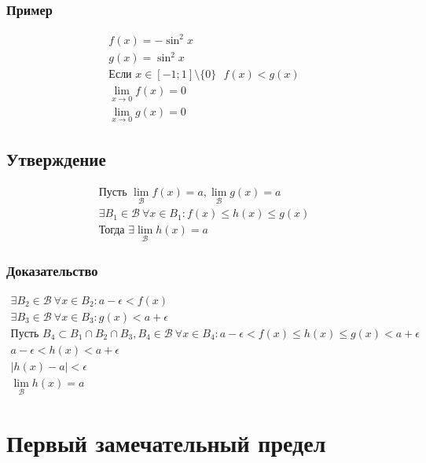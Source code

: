 \documentclass{article}
\begin{document}
\subsubsection{Пример}
\begin{gather*}
    f(x) = -\sin^2 x \\
    g(x) =  \sin^2 x \\
    \text{Если } x \in [-1; 1] \setminus \{0\} ~~~ f(x) < g(x) \\
    \lim_{x \to 0} f(x) = 0 \\
    \lim_{x \to 0} g(x) = 0
\end{gather*}


\subsection{Утверждение}
\begin{gather*}
    \text{Пусть } \lim_{\mathcal{B}} f(x) = a, \lim_{\mathcal{B}} g(x) = a \\
    \exists B_1 \in \mathcal{B} ~ \forall x \in B_1: f(x) \le h(x) \le g(x) \\
    \text{Тогда } \exists \lim_{\mathcal{B}} h(x) = a
\end{gather*}

\subsubsection{Доказательство}
\begin{gather*}
    \exists B_2 \in \mathcal{B} ~ \forall x \in B_2: a - \epsilon < f(x) \\
    \exists B_3 \in \mathcal{B} ~ \forall x \in B_3: g(x) < a + \epsilon \\
    \text{Пусть } B_4 \subset B_1 \cap B_2 \cap B_3, B_4 \in \mathcal{B} ~ \forall x \in B_4: a - \epsilon < f(x) \le h(x) \le g(x) < a + \epsilon \\
    a - \epsilon < h(x) < a + \epsilon \\
    |h(x) - a| < \epsilon \\
    \lim_{\mathcal{B}} h(x) = a
\end{gather*}



\section{Первый замечательный предел}
\end{document}
